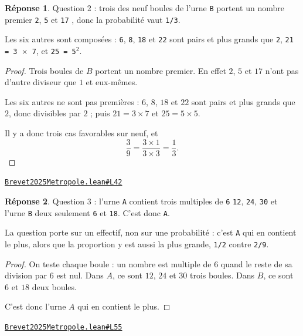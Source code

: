 \documentclass[11pt,a4paper]{article}
\theoremstyle{definition}
\theoremstyle{plain}
\theoremstyle{definition}
\newtheorem*{reponse}{Réponse}
\newcommand{\source}[2]{\par\smallskip\noindent\hfill{\footnotesize\href{#1}{\texttt{#2}}}\par\smallskip}
\begin{document}
\begin{reponse}
Question 2 : trois des neuf boules de l'urne \texttt{B} portent un nombre premier \textemdash{}
\texttt{2}, \texttt{5} et \texttt{17} \textemdash{}, donc la probabilité vaut \texttt{1/3}.

Les six autres sont composées : \texttt{6}, \texttt{8}, \texttt{18} et \texttt{22} sont pairs et plus grands que
\texttt{2}, \texttt{21 = 3 \(\times\) 7}, et \texttt{25 = 5\(^{2}\)}.
\end{reponse}
\begin{proof}
Trois boules de $B$ portent un nombre premier. En effet $2$, $5$ et $17$ n'ont pas d'autre
diviseur que $1$ et eux-mêmes.

Les six autres ne sont pas premières : $6$, $8$, $18$ et $22$ sont pairs et plus grands que
$2$, donc divisibles par $2$ ; puis $21 = 3 \times 7$ et $25 = 5 \times 5$.

Il y a donc trois cas favorables sur neuf, et
\[ \frac{3}{9} = \frac{3 \times 1}{3 \times 3} = \frac{1}{3} . \]
\end{proof}
\source{https://github.com/Commutator-IO/learn-lean/blob/main/exams/2025/Brevet2025Metropole.lean\#L42}{Brevet2025Metropole.lean\#L42}

\begin{reponse}
Question 3 : l'urne \texttt{A} contient trois multiples de \texttt{6} \textemdash{} \texttt{12}, \texttt{24}, \texttt{30} \textemdash{} et
l'urne \texttt{B} deux seulement \textemdash{} \texttt{6} et \texttt{18}. C'est donc \texttt{A}.

La question porte sur un effectif, non sur une probabilité : c'est \texttt{A} qui en contient
le plus, alors que la proportion y est aussi la plus grande, \texttt{1/2} contre \texttt{2/9}.
\end{reponse}
\begin{proof}
On teste chaque boule : un nombre est multiple de $6$ quand le reste de sa division par $6$
est nul. Dans $A$, ce sont $12$, $24$ et $30$ \textemdash{} trois boules. Dans $B$, ce sont
$6$ et $18$ \textemdash{} deux boules.

C'est donc l'urne $A$ qui en contient le plus.
\end{proof}
\source{https://github.com/Commutator-IO/learn-lean/blob/main/exams/2025/Brevet2025Metropole.lean\#L55}{Brevet2025Metropole.lean\#L55}
\end{document}
